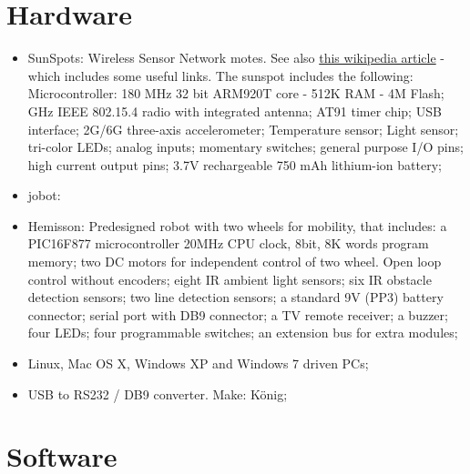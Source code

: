 \documentclass[a4paper, 12pt, titlepage]{article}
\begin{document}



\section{Hardware}
\begin{itemize}
    \item SunSpots: Wireless Sensor Network motes. See also 
    \href{http://en.wikipedia.org/wiki/Sun_SPOT}
        {this wikipedia article} - which includes some useful links. The sunspot
        includes the following:
        \subitem Microcontroller: 180 MHz 32 bit ARM920T core - 512K RAM - 4M
        Flash;
         GHz IEEE 802.15.4 radio with integrated antenna;
        \subitem AT91 timer chip;
        \subitem USB interface;
        \subitem 2G/6G three-axis accelerometer;
        \subitem Temperature sensor;
        \subitem Light sensor;
         tri-color LEDs;
         analog inputs;
         momentary switches;
         general purpose I/O pins;
         high current output pins;
        \subitem 3.7V rechargeable 750 mAh lithium-ion battery;
    \item jobot: 
    \item Hemisson: Predesigned robot with two wheels for mobility, that includes:
        \subitem a PIC16F877 microcontroller 20MHz CPU clock, 8bit, 8K words
        program memory;
        \subitem two DC motors for independent control of two wheel. Open loop
        control without encoders;
        \subitem eight IR ambient light sensors;
        \subitem six IR obstacle detection sensors;
        \subitem two line detection sensors;
        \subitem a standard 9V (PP3) battery connector;
        \subitem serial port with DB9 connector;
        \subitem a TV remote receiver;
        \subitem a buzzer;
        \subitem four LEDs;
        \subitem four programmable switches;
        \subitem an extension bus for extra modules;
    \item Linux, Mac OS X, Windows XP and Windows 7 driven PCs;
    \item USB to RS232 / DB9 converter. Make: K\"onig;
        

\end{itemize}

\section{Software}
\end{document}
